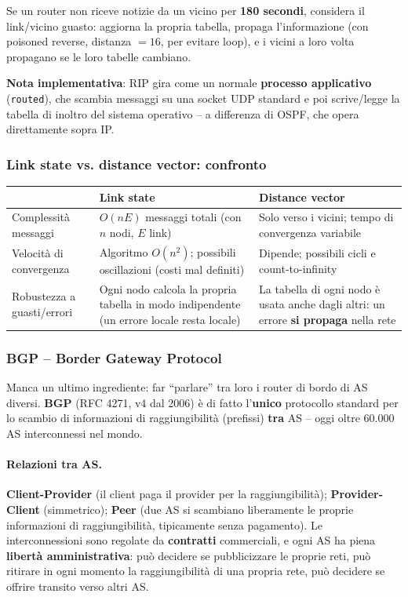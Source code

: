\documentclass[12pt, a4paper]{article}
\begin{document}
Se un router non riceve notizie da un vicino per \textbf{180 secondi}, considera il link/vicino guasto: aggiorna la propria tabella, propaga l'informazione (con poisoned reverse, distanza $=16$, per evitare loop), e i vicini a loro volta propagano se le loro tabelle cambiano.

\textbf{Nota implementativa}: RIP gira come un normale \textbf{processo applicativo} (\texttt{routed}), che scambia messaggi su una socket UDP standard e poi scrive/legge la tabella di inoltro del sistema operativo -- a differenza di OSPF, che opera direttamente sopra IP.

\subsubsection{Link state vs. distance vector: confronto}

\begin{table}[H]
\centering
\small
\begin{tabular}{p{4cm}p{5.5cm}p{5.5cm}}
\toprule
 & \textbf{Link state} & \textbf{Distance vector} \\
\midrule
Complessità messaggi & $O(nE)$ messaggi totali (con $n$ nodi, $E$ link) & Solo verso i vicini; tempo di convergenza variabile \\
Velocità di convergenza & Algoritmo $O(n^2)$; possibili oscillazioni (costi mal definiti) & Dipende; possibili cicli e count-to-infinity \\
Robustezza a guasti/errori & Ogni nodo calcola la propria tabella in modo indipendente (un errore locale resta locale) & La tabella di ogni nodo è usata anche dagli altri: un errore \textbf{si propaga} nella rete \\
\bottomrule
\end{tabular}
\end{table}

\subsubsection{BGP -- Border Gateway Protocol}

Manca un ultimo ingrediente: far ``parlare'' tra loro i router di bordo di AS diversi. \textbf{BGP} (RFC 4271, v4 dal 2006) è di fatto l'\textbf{unico} protocollo standard per lo scambio di informazioni di raggiungibilità (prefissi) \textbf{tra} AS -- oggi oltre 60.000 AS interconnessi nel mondo.

\paragraph{Relazioni tra AS.} \textbf{Client-Provider} (il client paga il provider per la raggiungibilità); \textbf{Provider-Client} (simmetrico); \textbf{Peer} (due AS si scambiano liberamente le proprie informazioni di raggiungibilità, tipicamente senza pagamento). Le interconnessioni sono regolate da \textbf{contratti} commerciali, e ogni AS ha piena \textbf{libertà amministrativa}: può decidere se pubblicizzare le proprie reti, può ritirare in ogni momento la raggiungibilità di una propria rete, può decidere se offrire transito verso altri AS.
\end{document}
